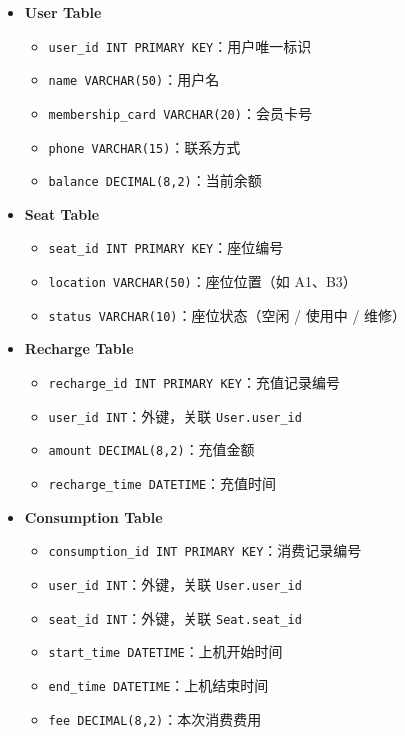 \documentclass[12pt,a4paper]{article}
\begin{document}
\begin{itemize}
    \item \textbf{User Table}
    \begin{itemize}
        \item \texttt{user\_id INT PRIMARY KEY}：用户唯一标识
        \item \texttt{name VARCHAR(50)}：用户名
        \item \texttt{membership\_card VARCHAR(20)}：会员卡号
        \item \texttt{phone VARCHAR(15)}：联系方式
        \item \texttt{balance DECIMAL(8,2)}：当前余额
    \end{itemize}
    \item \textbf{Seat Table}
    \begin{itemize}
        \item \texttt{seat\_id INT PRIMARY KEY}：座位编号
        \item \texttt{location VARCHAR(50)}：座位位置（如 A1、B3）
        \item \texttt{status VARCHAR(10)}：座位状态（空闲 / 使用中 / 维修）
    \end{itemize}
    \item \textbf{Recharge Table}
    \begin{itemize}
        \item \texttt{recharge\_id INT PRIMARY KEY}：充值记录编号
        \item \texttt{user\_id INT}：外键，关联 \texttt{User.user\_id}
        \item \texttt{amount DECIMAL(8,2)}：充值金额
        \item \texttt{recharge\_time DATETIME}：充值时间
    \end{itemize}
    \item \textbf{Consumption Table}
    \begin{itemize}
        \item \texttt{consumption\_id INT PRIMARY KEY}：消费记录编号
        \item \texttt{user\_id INT}：外键，关联 \texttt{User.user\_id}
        \item \texttt{seat\_id INT}：外键，关联 \texttt{Seat.seat\_id}
        \item \texttt{start\_time DATETIME}：上机开始时间
        \item \texttt{end\_time DATETIME}：上机结束时间
        \item \texttt{fee DECIMAL(8,2)}：本次消费费用
    \end{itemize}
\end{itemize}
\end{document}
